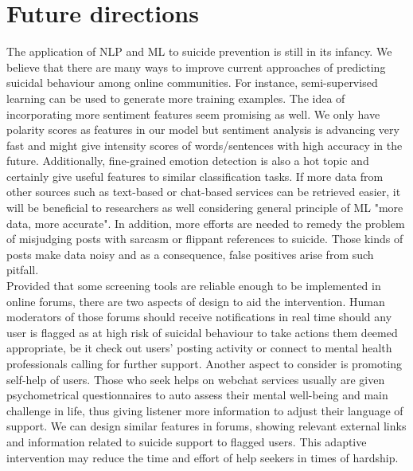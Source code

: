 \section{Future directions}
The application of NLP and ML to suicide prevention is still in its infancy. We believe that there are many ways to improve current approaches of predicting suicidal behaviour among online communities. For instance, semi-supervised learning can be used to generate more training examples. The idea of incorporating more sentiment features seem promising as well. We only have polarity scores as features in our model but sentiment analysis is advancing very fast and might give intensity scores of words/sentences with high accuracy in the future. Additionally, fine-grained emotion detection is also a hot topic and certainly give useful features to similar classification tasks. If more data from other sources such as text-based or chat-based services can be retrieved easier, it will be beneficial to researchers as well considering general principle of ML "more data, more accurate". In addition, more efforts are needed to remedy the problem of misjudging posts with sarcasm or flippant references to suicide. Those kinds of posts make data noisy and as a consequence, false positives arise from such pitfall. \\
Provided that some screening tools are reliable enough to be implemented in online forums, there are two aspects of design to aid the intervention. Human moderators of those forums should receive notifications in real time should any user is flagged as at high risk of suicidal behaviour to take actions them deemed appropriate, be it check out users' posting activity or connect to mental health professionals calling for further support. Another aspect to consider is promoting self-help of users. Those who seek helps on webchat services usually are given psychometrical questionnaires to auto assess their mental well-being and main challenge in life, thus giving listener more information to adjust their language of support. We can design similar features in forums, showing relevant external links and information related to suicide support to flagged users. This adaptive intervention may reduce the time and effort of help seekers in times of hardship.




